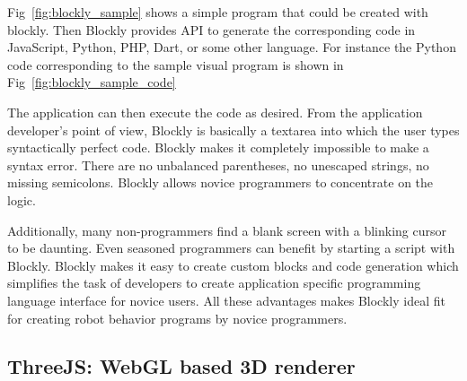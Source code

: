 Fig~\ref{fig:blockly_sample} shows a simple program that could be created with blockly. Then Blockly provides API to generate the corresponding code in JavaScript, Python, PHP, Dart, or some other language. For instance the Python code corresponding to the sample visual program is shown in Fig~\ref{fig:blockly_sample_code}

The application can then execute the code as desired. From the application developer's point of view, Blockly is basically a textarea into which the user types syntactically perfect code.  Blockly makes it completely impossible to make a syntax error. There are no unbalanced parentheses, no unescaped strings, no missing semicolons. Blockly allows novice programmers to concentrate on the logic.

Additionally, many non-programmers find a blank screen with a blinking cursor to be daunting. Even seasoned programmers can benefit by starting a script with Blockly. Blockly makes it easy to create custom blocks and code generation which simplifies the task of developers to create application specific programming language interface for novice users. All these advantages makes Blockly ideal fit for creating robot behavior programs by novice programmers.

\subsection{ThreeJS: WebGL based 3D renderer}

